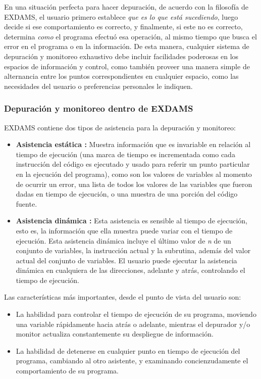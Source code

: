 \documentclass[12pt,legalpaper]{report}
\begin{document}
En una situación perfecta para hacer depuración, de acuerdo con la filosofía de EXDAMS, el usuario primero establece \textit{que es lo que está sucediendo}, luego decide si ese comportamiento es correcto, y finalmente, si este no es correcto, determina \textit{como} el programa efectuó esa operación, al mismo tiempo que busca el error en el programa o en la información.  De esta manera, cualquier sistema de depuración y monitoreo exhaustivo debe incluir facilidades poderosas en los espacios de información y control, como también proveer una manera simple de alternancia entre los puntos correspondientes en cualquier espacio, como las necesidades del usuario o preferencias personales le indiquen.

			\subsubsection[Depuración y monitoreo]{Depuración y monitoreo dentro de EXDAMS}

EXDAMS contiene dos tipos de asistencia para la depuración y monitoreo:

\begin{itemize}
	\item \textbf{Asistencia estática :} Muestra información que es invariable en relación al tiempo de ejecución (una marca de tiempo es incrementada como cada instrucción del código es ejecutado y usado para referir un punto particular en la ejecución del programa), como son los valores de variables al momento de ocurrir un error, una lista de todos los valores de las variables que fueron dadas en tiempo de ejecución, o una muestra de una porción del código fuente.

	\item \textbf{Asistencia dinámica :} Esta asistencia es sensible al tiempo de ejecución, esto es, la información que ella muestra puede variar con el tiempo de ejecución.  Esta asistencia dinámica incluye el último valor de \textit{n} de un conjunto de variables, la instrucción actual y la subrutina, además del valor actual del conjunto de variables.  El usuario puede ejecutar la asistencia dinámica en cualquiera de las direcciones, adelante y atrás, controlando el tiempo de ejecución.

\end{itemize}

Las características más importantes, desde el punto de vista del usuario son:

\begin{itemize}
	\item La habilidad para controlar el tiempo de ejecución de su programa, moviendo una variable rápidamente hacia atrás o adelante, mientras el depurador y/o monitor actualiza constantemente su despliegue de información.

	\item La habilidad de detenerse en cualquier punto en tiempo de ejecución del programa, cambiando al otro asistente, y examinando concienzudamente el comportamiento de su programa.

\end{itemize}
\end{document}

